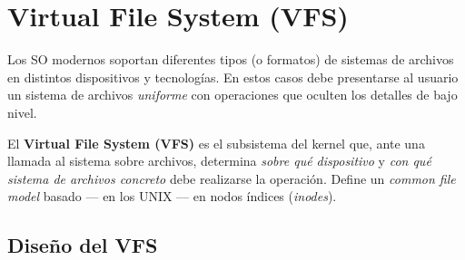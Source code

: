 \documentclass[11pt,a4paper]{article}
\begin{document}
\section{Virtual File System (VFS)}

Los SO modernos soportan diferentes tipos (o formatos) de sistemas de
archivos en distintos dispositivos y tecnologías. En estos casos debe
presentarse al usuario un sistema de archivos \emph{uniforme} con
operaciones que oculten los detalles de bajo nivel.

\begin{definicion}
El \textbf{Virtual File System (VFS)} es el subsistema del kernel
que, ante una llamada al sistema sobre archivos, determina
\emph{sobre qué dispositivo} y \emph{con qué sistema de archivos
concreto} debe realizarse la operación. Define un \emph{common file
model} basado --- en los UNIX --- en nodos índices (\emph{inodes}).
\end{definicion}

\subsection{Diseño del VFS}
\end{document}
